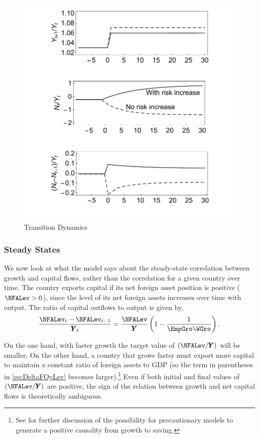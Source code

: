 \documentclass[titlepage]{\econtex}\newcommand{\texname}{cjSOE}
\renewcommand{\GDPLev}{\ensuremath{\pmb{Y}}}
\begin{document}
\medskip

\begin{figure}
\includegraphics{./Figures/transDyn}
\caption{Transition Dynamics}\label{fig:transDyn}
\end{figure}
\medskip


\subsubsection{Steady States}

We now look at what the model says about the steady-state correlation between growth and capital flows, rather than the correlation for a given country over time. The country exports capital if its net foreign asset position is positive ($\NFALev>0$), since the level of its net foreign assets increases over time with output. The ratio of capital outflows to output is given by,
\begin{equation}
\frac{\NFALev_t-\NFALev_{t-1}}{\GDPLev_t}=\frac{\NFALev}{\GDPLev}\left(1 -\frac{1}{\EmpGro \WGro} \right).
\label{eq:DeltaFOyLev}
\end{equation}

On the one hand, with faster growth the target value of
$(\NFALev/\GDPLev)$ will be smaller.  On the other hand, a country
that grows faster must export more capital to maintain a constant
ratio of foreign assets to GDP (so the term in parentheses in
\eqref{eq:DeltaFOyLev} becomes larger).\footnote{See
  \cite{carroll:RiskyHabits} for further discussion of the possibility
  for precautionary models to generate a positive causality from
  growth to saving.}  Even if both initial and final values of
$(\NFALev/\GDPLev)$ are positive, the sign of the relation between
growth and net capital flows is theoretically ambiguous.
\end{document}
